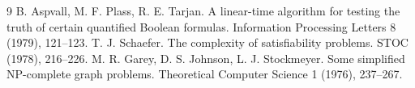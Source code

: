 \documentclass[11pt]{article}
\begin{document}
\begin{thebibliography}{9}
 B. Aspvall, M. F. Plass, R. E. Tarjan. A linear-time algorithm for testing the truth of certain quantified Boolean formulas. Information Processing Letters 8 (1979), 121--123.
 T. J. Schaefer. The complexity of satisfiability problems. STOC (1978), 216--226.
 M. R. Garey, D. S. Johnson, L. J. Stockmeyer. Some simplified NP-complete graph problems. Theoretical Computer Science 1 (1976), 237--267.
\end{thebibliography}
\end{document}
